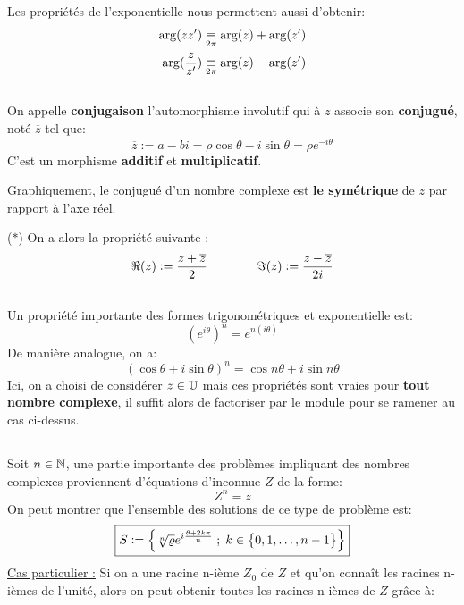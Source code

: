 Les propriétés de l'exponentielle nous permettent aussi d'obtenir:
\begin{align*}
   \arg(zz') &\eqmod{2\pi} \arg(z) + \arg(z') \\
   \arg(\frac{z}{z'}) &\eqmod{2\pi} \arg(z) - \arg(z')
\end{align*}

\subsection*{}
On appelle \textbf{conjugaison} l'automorphisme involutif qui à \(z\) associe son \textbf{conjugué}, noté \(\overline{z}\) tel que:
\[
    \boxed{
        \overline{z} := a - bi = \rho\cos\theta - i\sin\theta = \rho e^{-i\theta}
    }
\]
C'est un morphisme \textbf{additif} et \textbf{multiplicatif}.

Graphiquement, le conjugué d'un nombre complexe est \textbf{le symétrique} de \(z\) par rapport à l'axe réel.\<

(\(\ast\)) On a alors la propriété suivante {:}
\[
  \begin{aligned}
     \Re(z) := \frac{z + \overline{z}}{2}
  \end{aligned}
  \hspace*{40pt}
  \begin{aligned}
     \Im(z) := \frac{z - \overline{z}}{2i}
  \end{aligned}
\]
\subsection*{}
Un propriété importante des formes trigonométriques et exponentielle est:
\[
   {(e^{i\theta})}^n = e^{n(i\theta)}
\]
De manière analogue, on a:
\[
   {(\cos\theta + i\sin\theta)}^n = \cos n\theta + i\sin n\theta
\]
Ici, on a choisi de considérer \(z \in \U\) mais ces propriétés sont vraies pour \textbf{tout nombre complexe}, il suffit alors de factoriser par le module pour se ramener au cas ci-dessus.
\subsection*{}
Soit \(n \in \N\), une partie importante des problèmes impliquant des nombres complexes proviennent d'équations d'inconnue \(Z\) de la forme:
\[
   Z^n = z
\]
On peut montrer que l'ensemble des solutions de ce type de problème est:
\[
   \boxed{
      S := \Bigl\{ \sqrt[n]{\rho}e^{i\frac{\theta + 2k\pi}{n}}\; ; \; k \in \bigl\{0, 1, \ldots , n-1 \bigl\} \Bigl\}   
   }
\]
\underline{Cas particulier {:}}
Si on a une racine n-ième \(Z_0\) de \(Z\) et qu'on connaît les racines n-ièmes de l'unité, alors on peut obtenir toutes les racines n-ièmes de \(Z\) grâce à:

